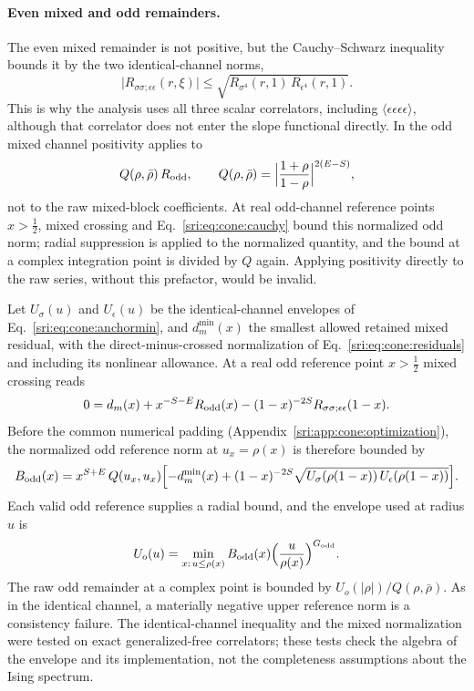 \paragraph{Even mixed and odd remainders.} The even mixed remainder is not positive, but the Cauchy--Schwarz inequality
bounds it by the two identical-channel norms,
\begin{equation}
 \bigl|R_{\sigma\sigma;\epsilon\epsilon}(r,\xi)\bigr|\le\sqrt{R_{\sigma^4}(r,1)\,R_{\epsilon^4}(r,1)} .
 \label{sri:eq:cone:cauchy}
\end{equation}
This is why the analysis uses all three scalar correlators, including $\langle\epsilon\epsilon\epsilon\epsilon\rangle$,
although that correlator does not enter the slope functional directly. In the odd mixed channel positivity applies to
\begin{equation}
 Q(\rho,\bar\rho)\,R_{\rm odd},\qquad Q(\rho,\bar\rho)=\Bigl|\frac{1+\rho}{1-\rho}\Bigr|^{2(E-S)},
 \label{sri:eq:cone:Q}
\end{equation}
not to the raw mixed-block coefficients. At real odd-channel reference points $x>\frac12$, mixed crossing and
Eq.~\eqref{sri:eq:cone:cauchy} bound this normalized odd norm; radial suppression is applied to the normalized quantity, and
the bound at a complex integration point is divided by $Q$ again. Applying positivity directly to the raw series,
without this prefactor, would be invalid.

Let $U_\sigma(u)$ and $U_\epsilon(u)$ be the identical-channel envelopes of Eq.~\eqref{sri:eq:cone:anchormin}, and
$d_m^{\min}(x)$ the smallest allowed retained mixed residual, with the direct-minus-crossed normalization of
Eq.~\eqref{sri:eq:cone:residuals} and including its nonlinear allowance. At a real odd reference point $x>\frac12$ mixed
crossing reads
\begin{equation}
 0=d_m(x)+x^{-S-E}R_{\rm odd}(x)-(1-x)^{-2S}R_{\sigma\sigma;\epsilon\epsilon}(1-x).
\end{equation}
Before the common numerical padding (Appendix~\ref{sri:app:cone:optimization}), the normalized odd reference norm at
$u_x=\rho(x)$ is therefore bounded by
\begin{equation}
 B_{\rm odd}(x)=x^{S+E}\,Q(u_x,u_x)\Bigl[-d_m^{\min}(x)+(1-x)^{-2S}\sqrt{U_\sigma(\rho(1-x))\,U_\epsilon(\rho(1-x))}\Bigr].
 \label{sri:eq:cone:oddanchor}
\end{equation}
Each valid odd reference supplies a radial bound, and the envelope used at radius $u$ is
\begin{equation}
 U_o(u)=\min_{x:\,u\le\rho(x)}B_{\rm odd}(x)\Bigl(\frac{u}{\rho(x)}\Bigr)^{G_{\rm odd}} .
 \label{sri:eq:cone:oddenv}
\end{equation}
The raw odd remainder at a complex point is bounded by $U_o(|\rho|)/Q(\rho,\bar\rho)$. As in the identical channel, a
materially negative upper reference norm is a consistency failure. The identical-channel inequality and the mixed
normalization were tested on exact generalized-free correlators; these tests check the algebra of the envelope and its
implementation, not the completeness assumptions about the Ising spectrum.

